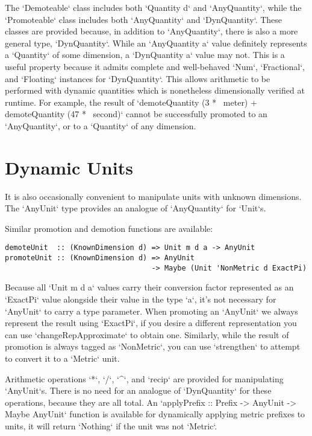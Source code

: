 \documentclass[11pt]{report}
\begin{document}
The `Demoteable` class includes both `Quantity d` and `AnyQuantity`, while the `Promoteable` class includes both
`AnyQuantity` and `DynQuantity`. These classes are provided because, in addition to `AnyQuantity`, there is also a more general type, `DynQuantity`.
While an `AnyQuantity a` value definitely represents a `Quantity` of some dimension, a `DynQuantity a` value may not.
This is a useful property because it admits complete and well-behaved `Num`, `Fractional`, and `Floating` instances for `DynQuantity`. This allows
arithmetic to be performed with dynamic quantities which is nonetheless dimensionally verified at runtime. For example,
the result of `demoteQuantity (3 *~ meter) + demoteQuantity (47 *~ second)` cannot be successfully promoted to an
`AnyQuantity`, or to a `Quantity` of any dimension.

\section{Dynamic Units}

It is also occasionally convenient to manipulate units with unknown dimensions. The `AnyUnit` type provides
an analogue of `AnyQuantity` for `Unit`s.

Similar promotion and demotion functions are available:

\begin{lstlisting}
demoteUnit  :: (KnownDimension d) => Unit m d a -> AnyUnit
promoteUnit :: (KnownDimension d) => AnyUnit
                                  -> Maybe (Unit 'NonMetric d ExactPi)
\end{lstlisting}

Because all `Unit m d a` values carry their conversion factor represented as an `ExactPi` value alongside their value in
the type `a`, it's not necessary for `AnyUnit` to carry a type parameter. When promoting an `AnyUnit` we always represent
the result using `ExactPi`, if you desire a different representation you can use `changeRepApproximate` to obtain one.
Similarly, while the result of promotion is always tagged as `NonMetric`, you can use `strengthen` to attempt to convert
it to a `Metric` unit.

Arithmetic operations `*`, `/`, `^`, and `recip` are provided for manipulating `AnyUnit`s. There is no need for an analogue
of `DynQuantity` for these operations, because they are all total. An `applyPrefix :: Prefix -> AnyUnit -> Maybe AnyUnit`
function is available for dynamically applying metric prefixes to units, it will return `Nothing` if the unit was not `Metric`.
\end{document}
